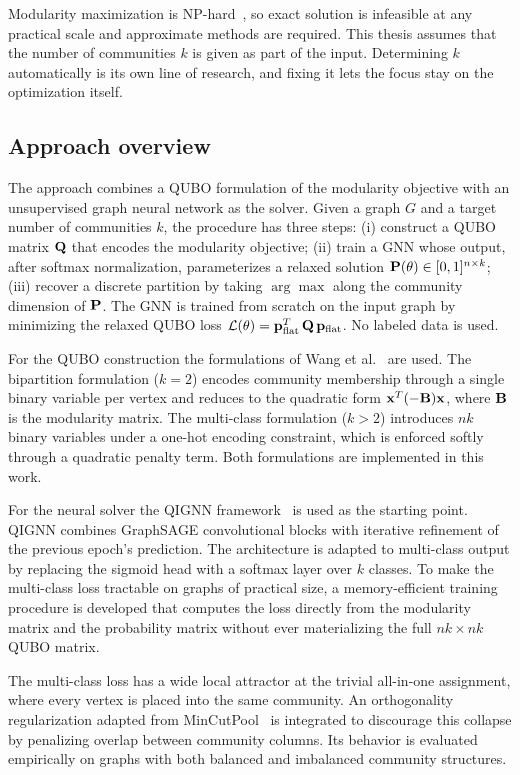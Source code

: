 Modularity maximization is NP-hard~\cite{brandes2008modularity}, so
exact solution is infeasible at any practical scale and approximate
methods are required. This thesis assumes that the number of
communities $k$ is given as part of the input. Determining $k$
automatically is its own line of research, and fixing it lets the
focus stay on the optimization itself.


\subsection{Approach overview}
\label{sec:approach_overview}

The approach combines a QUBO formulation of the modularity objective
with an unsupervised graph neural network as the solver. Given a
graph $G$ and a target number of communities $k$, the procedure has
three steps: (i) construct a QUBO matrix $\mathbf{Q}$ that encodes the
modularity objective; (ii) train a GNN whose output, after softmax
normalization, parameterizes a relaxed solution $\mathbf{P}(\theta) \in
[0,1]^{n \times k}$; (iii) recover a discrete partition by taking
$\arg\max$ along the community dimension of $\mathbf{P}$. The GNN is
trained from scratch on the input graph by minimizing the relaxed
QUBO loss $\mathcal{L}(\theta) = \mathbf{p}_{\mathrm{flat}}^T \, \mathbf{Q} \,
\mathbf{p}_{\mathrm{flat}}$. No labeled data is used.

For the QUBO construction the formulations of Wang et
al.~\cite{wang2024quantum} are used. The bipartition formulation
($k=2$) encodes community membership through a single binary
variable per vertex and reduces to the quadratic form $\mathbf{x}^T (-\mathbf{B})
\mathbf{x}$, where $\mathbf{B}$ is the modularity matrix. The multi-class
formulation ($k > 2$) introduces $nk$ binary variables under a
one-hot encoding constraint, which is enforced softly through a
quadratic penalty term. Both formulations are implemented in this
work.

For the neural solver the QIGNN framework~\cite{qignn2026} is used
as the starting point. QIGNN combines GraphSAGE convolutional
blocks with iterative refinement of the previous epoch's prediction.
The architecture is adapted to multi-class output by replacing the
sigmoid head with a softmax layer over $k$ classes. To make the
multi-class loss tractable on graphs of practical size, a
memory-efficient training procedure is developed that computes the
loss directly from the modularity matrix and the probability matrix
without ever materializing the full $nk \times nk$ QUBO matrix.

The multi-class loss has a wide local attractor at the trivial
all-in-one assignment, where every vertex is placed into the same
community. An orthogonality regularization adapted from
MinCutPool~\cite{bianchi2020spectral} is integrated to discourage
this collapse by penalizing overlap between community columns. Its
behavior is evaluated empirically on graphs with both balanced and
imbalanced community structures.

